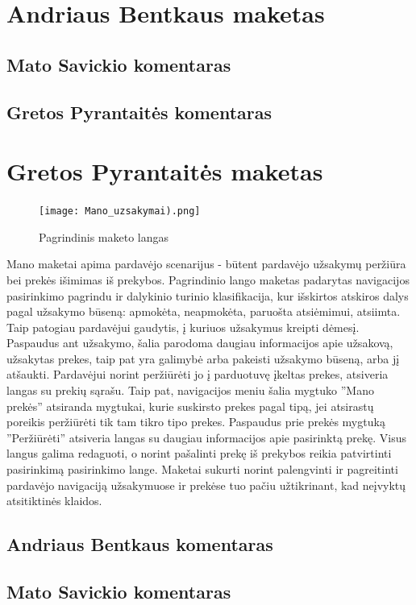 \documentclass[oneside]{VUMIFPSkursinis}
\begin{document}
\section{Andriaus Bentkaus maketas}
	\subsection{Mato Savickio komentaras}
	\subsection{Gretos Pyrantaitės komentaras}

\section{Gretos Pyrantaitės maketas}
\begin{figure}
  		\texttt{[image: Mano\_uzsakymai).png]}
  		\caption{Pagrindinis maketo langas}
 		 \label{fig:mak2}
	\end{figure}
Mano maketai apima pardavėjo scenarijus -  būtent pardavėjo užsakymų peržiūra bei prekės išimimas iš prekybos.
Pagrindinio lango maketas padarytas navigacijos pasirinkimo pagrindu ir dalykinio turinio klasifikacija, kur išskirtos atskiros dalys pagal užsakymo būseną: apmokėta, neapmokėta, paruošta atsiėmimui, atsiimta. 
Taip patogiau pardavėjui gaudytis, į kuriuos užsakymus kreipti dėmesį.
Paspaudus ant užsakymo, šalia parodoma daugiau informacijos apie užsakovą, užsakytas prekes, taip pat yra galimybė arba pakeisti užsakymo būseną, arba jį atšaukti.
Pardavėjui norint peržiūrėti jo į parduotuvę įkeltas prekes, atsiveria langas su prekių sąrašu.
Taip pat, navigacijos meniu šalia mygtuko ''Mano prekės'' atsiranda mygtukai, kurie suskirsto prekes pagal tipą, jei atsirastų poreikis peržiūrėti tik tam tikro tipo prekes.
Paspaudus prie prekės mygtuką ''Peržiūrėti'' atsiveria langas su daugiau informacijos apie pasirinktą prekę.
Visus langus galima redaguoti, o norint pašalinti prekę iš prekybos reikia patvirtinti pasirinkimą pasirinkimo lange.
Maketai sukurti norint palengvinti ir pagreitinti pardavėjo navigaciją užsakymuose ir prekėse tuo pačiu užtikrinant, kad neįvyktų atsitiktinės klaidos.

	
	\subsection{Andriaus Bentkaus komentaras}
	\subsection{Mato Savickio komentaras}
\end{document}
